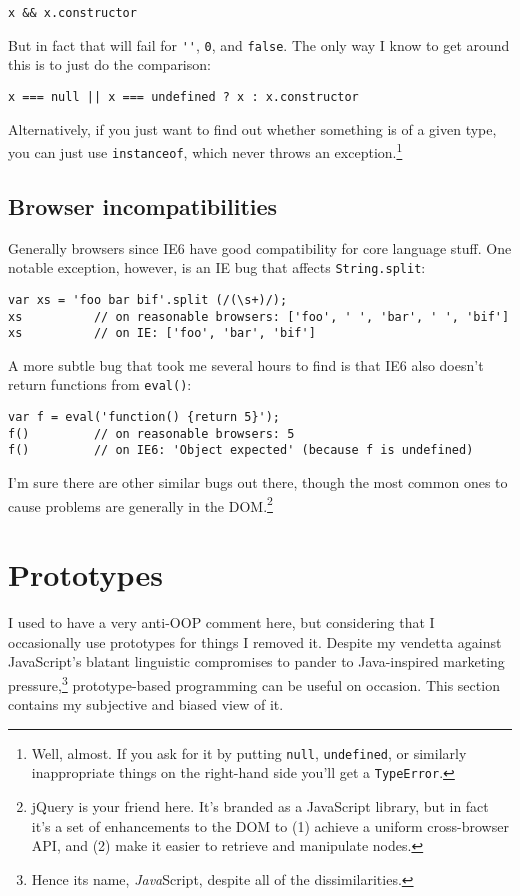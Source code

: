 \documentclass{article}
\begin{document}
\begin{verbatim}
x && x.constructor
\end{verbatim}

    But in fact that will fail for \verb|''|, \verb|0|, and \verb|false|. The only way I know to get around this is to just do the comparison:

\begin{verbatim}
x === null || x === undefined ? x : x.constructor
\end{verbatim}

    Alternatively, if you just want to find out whether something is of a given type, you can just use \verb|instanceof|, which never throws an exception.\footnote{Well, almost. If you ask for
    it by putting {\tt null}, {\tt undefined}, or similarly inappropriate things on the right-hand side you'll get a {\tt TypeError}.}

\subsection {Browser incompatibilities}
    Generally browsers since IE6 have good compatibility for core language stuff. One notable exception, however, is an IE bug that affects \verb|String.split|:

\begin{verbatim}
var xs = 'foo bar bif'.split (/(\s+)/);
xs          // on reasonable browsers: ['foo', ' ', 'bar', ' ', 'bif']
xs          // on IE: ['foo', 'bar', 'bif']
\end{verbatim}

    A more subtle bug that took me several hours to find is that IE6 also doesn't return functions from \verb|eval()|:

\begin{verbatim}
var f = eval('function() {return 5}');
f()         // on reasonable browsers: 5
f()         // on IE6: 'Object expected' (because f is undefined)
\end{verbatim}

    I'm sure there are other similar bugs out there, though the most common ones to cause problems are generally in the DOM.\footnote{jQuery is your friend here. It's branded as a JavaScript
    library, but in fact it's a set of enhancements to the DOM to (1) achieve a uniform cross-browser API, and (2) make it easier to retrieve and manipulate nodes.}

\section {Prototypes}
  \label{sec:prototypes}
  I used to have a very anti-OOP comment here, but considering that I occasionally use prototypes for things I removed it. Despite my vendetta against JavaScript's blatant linguistic
  compromises to pander to Java-inspired marketing pressure,\footnote{Hence its name, {\it Java}Script, despite all of the dissimilarities.} prototype-based programming can be useful on
  occasion. This section contains my subjective and biased view of it.
\end{document}
